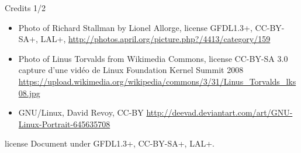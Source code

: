 \documentclass{beamer}
\begin{document}
\begin{frame}{Credits 1/2}
  \begin{itemize}
  \item Photo of Richard Stallman by Lionel Allorge, license GFDL1.3+, CC-BY-SA+, LAL+,  \url{http://photos.april.org/picture.php?/4413/category/159}
  \item Photo of Linus Torvalds from Wikimedia Commons, license CC-BY-SA 3.0 capture d'une vidéo de Linux Foundation Kernel Summit 2008 \url{https://upload.wikimedia.org/wikipedia/commons/3/31/Linus_Torvalds_lks08.jpg}
  \item GNU/Linux, David Revoy, CC-BY \url{http://deevad.deviantart.com/art/GNU-Linux-Portrait-645635708}
  
  \end{itemize}
\end{frame}

\begin{frame}{license}
  Document under GFDL1.3+, CC-BY-SA+, LAL+.
\end{frame}
\end{document}
